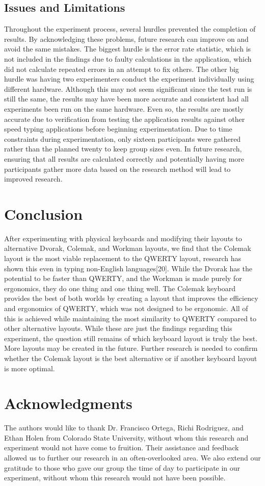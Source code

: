 \documentclass[manuscript,screen,review]{acmart}
\begin{document}
    \subsection{Issues and Limitations}
        Throughout the experiment process, several hurdles prevented the completion of results. By acknowledging these problems, future research can improve on and avoid the same mistakes. The biggest hurdle is the error rate statistic, which is not included in the findings due to faulty calculations in the application, which did not calculate repeated errors in an attempt to fix others. The other big hurdle was having two experimenters conduct the experiment individually using different hardware. Although this may not seem significant since the test run is still the same, the results may have been more accurate and consistent had all experiments been run on the same hardware. Even so, the results are mostly accurate due to verification from testing the application results against other speed typing applications before beginning experimentation. Due to time constraints during experimentation, only sixteen participants were gathered rather than the planned twenty to keep group sizes even. In future research, ensuring that all results are calculated correctly and potentially having more participants gather more data based on the research method will lead to improved research.
\section{Conclusion}
    After experimenting with physical keyboards and modifying their layouts to alternative Dvorak, Colemak, and Workman layouts, we find that the Colemak layout is the most viable replacement to the QWERTY layout, research has shown this even in typing non-English languages[20]. While the Dvorak has the potential to be faster than QWERTY, and the Workman is made purely for ergonomics, they do one thing and one thing well. The Colemak keyboard provides the best of both worlds by creating a layout that improves the efficiency and ergonomics of QWERTY, which was not designed to be ergonomic. All of this is achieved while maintaining the most similarity to QWERTY compared to other alternative layouts. While these are just the findings regarding this experiment, the question still remains of which keyboard layout is truly the best. More layouts may be created in the future. Further research is needed to confirm whether the Colemak layout is the best alternative or if another keyboard layout is more optimal.
\section{Acknowledgments}
    The authors would like to thank Dr. Francisco Ortega, Richi Rodriguez, and Ethan Holen from Colorado State University, without whom this research and experiment would not have come to fruition. Their assistance and feedback allowed us to further our research in an often-overlooked area. We also extend our gratitude to those who gave our group the time of day to participate in our experiment, without whom this research would not have been possible. 


\end{document}
